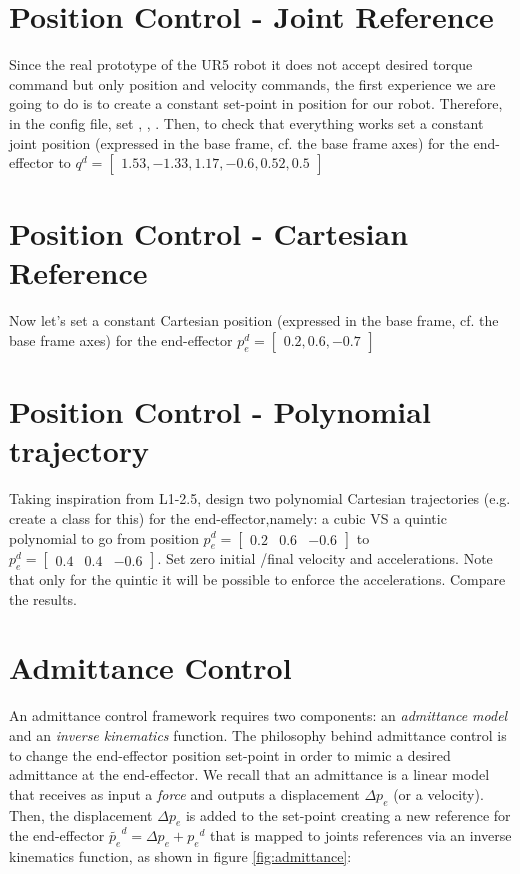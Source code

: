 \documentclass[11pt]{article}
\newcommand{\mat}[1]{\ensuremath{\begin{bmatrix}#1\end{bmatrix}}}	%
\begin{document}
\section{Position Control - Joint Reference}
Since the real prototype of the UR5 robot it does not accept desired torque command but only position and velocity commands, 
the first experience we are going to do is to create a constant set-point in position for our robot. 
Therefore, in the  config file, set ,   , .
Then, to check that everything works set a constant joint position (expressed in the base frame, cf. the base frame axes) for the end-effector to $q^d=\mat{1.53, -1.33, 1.17, -0.6, 0.52, 0.5}$

\section{Position Control - Cartesian Reference}
Now let's set a constant Cartesian position (expressed in the base frame, cf. the base frame axes) for the end-effector $p_e^d=\mat{0.2, 0.6, -0.7}   $

\section{Position Control - Polynomial trajectory}
Taking inspiration from L1-2.5, design two polynomial Cartesian trajectories (e.g. create a class for this) for the end-effector,namely: a cubic VS a quintic polynomial to go from position $p_e^d=\mat{0.2& 0.6& -0.6}$  to $p_e^d=\mat{0.4& 0.4& -0.6}$. Set zero initial /final velocity and accelerations. Note that only for the quintic it will be possible to enforce the accelerations. Compare the results.


\section{Admittance Control}
An admittance control framework requires two components: an \textit{admittance model} and an \textit{inverse kinematics} function.
The philosophy behind admittance control is to change the end-effector position set-point in order to mimic a desired admittance at the end-effector. We recall that an admittance is a linear model that receives  as input a \textit{force} and outputs a displacement $\Delta p_e$ (or a velocity). Then, the displacement $\Delta p_e$ is added to the set-point creating a new reference for the end-effector $\tilde{p_e}^d = \Delta p_e + {p_e}^d$  that is mapped to joints references via an inverse kinematics function, as shown in figure \ref{fig:admittance}:
\end{document}
